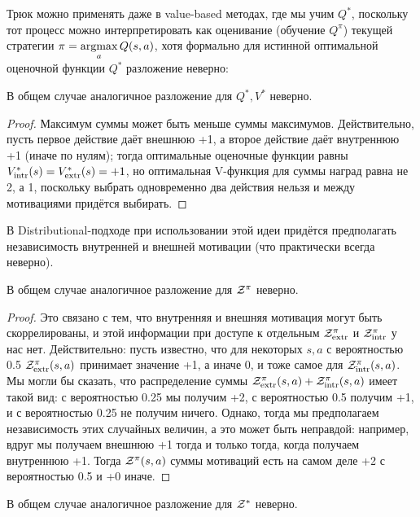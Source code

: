 Трюк можно применять даже в value-based методах, где мы учим $Q^*$, поскольку тот процесс можно интерпретировать как оценивание (обучение $Q^\pi$) текущей стратегии $\pi \HM= \argmax\limits_a Q(s, a)$, хотя формально для истинной оптимальной оценочной функции $Q^*$ разложение неверно: 

\begin{proposition}
В общем случае аналогичное разложение для $Q^*, V^*$ неверно.
\begin{proof}
Максимум суммы может быть меньше суммы максимумов. Действительно, пусть первое действие даёт внешнюю +1, а второе действие даёт внутреннюю +1 (иначе по нулям); тогда оптимальные оценочные функции равны $V^*_{\mathrm{intr}}(s) = V^*_{\mathrm{extr}}(s) = +1$, но оптимальная V-функция для суммы наград равна не 2, а 1, поскольку выбрать одновременно два действия нельзя и между мотивациями придётся выбирать.
\end{proof}
\end{proposition}

В Distributional-подходе при использовании этой идеи придётся предполагать независимость внутренней и внешней мотивации (что практически всегда неверно).

\begin{proposition}
В общем случае аналогичное разложение для $\mathcal{Z}^\pi$ неверно.
\begin{proof}
Это связано с тем, что внутренняя и внешняя мотивация могут быть скоррелированы, и этой информации при доступе к отдельным $\mathcal{Z}^\pi_{\mathrm{extr}}$ и $\mathcal{Z}^\pi_{\mathrm{intr}}$ у нас нет. Действительно: пусть известно, что для некоторых $s, a$ с вероятностью 0.5 $\mathcal{Z}^\pi_{\mathrm{extr}}(s, a)$ принимает значение +1, а иначе 0, и тоже самое для $\mathcal{Z}^\pi_{\mathrm{intr}}(s, a)$. Мы могли бы сказать, что распределение суммы $\mathcal{Z}^\pi_{\mathrm{extr}}(s, a) + \mathcal{Z}^\pi_{\mathrm{intr}}(s, a)$ имеет такой вид: с вероятностью 0.25 мы получим +2, с вероятностью 0.5 получим +1, и с вероятностью 0.25 не получим ничего. Однако, тогда мы предполагаем независимость этих случайных величин, а это может быть неправдой: например, вдруг мы получаем внешнюю +1 тогда и только тогда, когда получаем внутреннюю +1. Тогда $\mathcal{Z}^\pi(s, a)$ суммы мотиваций есть на самом деле +2 с вероятностью 0.5 и +0 иначе.
\end{proof}
\end{proposition}

\begin{proposition}
В общем случае аналогичное разложение для $\mathcal{Z}^*$ неверно.
\end{proposition}

